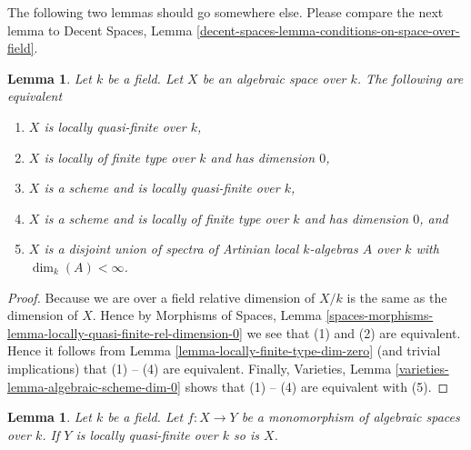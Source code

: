 \documentclass{stacks-project}
\theoremstyle{plain}
\newtheorem{lemma}[subsection]{Lemma}
\theoremstyle{definition}
\theoremstyle{remark}
\numberwithin{equation}{subsection}
\begin{document}
\noindent
The following two lemmas should go somewhere else.
Please compare the next lemma to
Decent Spaces, Lemma \ref{decent-spaces-lemma-conditions-on-space-over-field}.

\begin{lemma}
\label{lemma-locally-quasi-finite-over-field}
Let $k$ be a field. Let $X$ be an algebraic space over $k$.
The following are equivalent
\begin{enumerate}
\item $X$ is locally quasi-finite over $k$,
\item $X$ is locally of finite type over $k$ and has dimension $0$,
\item $X$ is a scheme and is locally quasi-finite over $k$,
\item $X$ is a scheme and is locally of finite type over $k$ and has
dimension $0$, and
\item $X$ is a disjoint union of spectra of Artinian local $k$-algebras
$A$ over $k$ with $\dim_k(A) < \infty$.
\end{enumerate}
\end{lemma}

\begin{proof}
Because we are over a field relative dimension of $X/k$ is the same as
the dimension of $X$. Hence by
Morphisms of Spaces,
Lemma \ref{spaces-morphisms-lemma-locally-quasi-finite-rel-dimension-0}
we see that (1) and (2) are equivalent. Hence it follows from
Lemma \ref{lemma-locally-finite-type-dim-zero}
(and trivial implications) that (1) -- (4) are equivalent.
Finally,
Varieties, Lemma \ref{varieties-lemma-algebraic-scheme-dim-0}
shows that (1) -- (4) are equivalent with (5).
\end{proof}

\begin{lemma}
\label{lemma-mono-towards-locally-quasi-finite-over-field}
Let $k$ be a field. Let $f : X \to Y$ be a monomorphism of algebraic spaces
over $k$. If $Y$ is locally quasi-finite over $k$ so is $X$.
\end{lemma}
\end{document}

